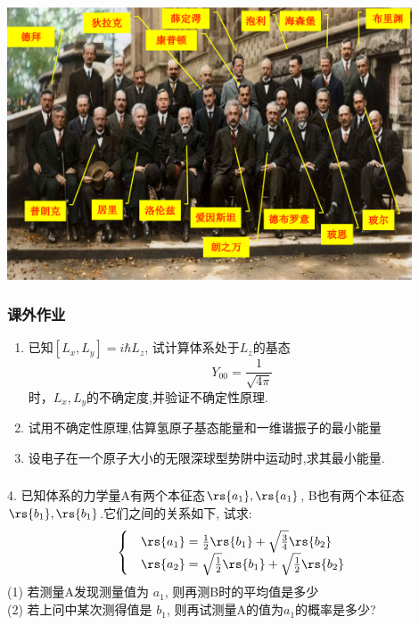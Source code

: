 \begin{frame} 
    \frametitle{}
    \includegraphics[width=0.9\textwidth]{figs/meet.png}
\end{frame} 

\begin{frame}
    \frametitle{课外作业}
    \begin{enumerate}
        \item 已知$[L_x, L_y]=i\hbar L_z$, 试计算体系处于$L_z$的基态 $$Y_{00}=\frac{1}{\sqrt{4\pi}}$$时，$L_x, L_y$的不确定度,并验证不确定性原理.
        \item 试用不确定性原理,估算氢原子基态能量和一维谐振子的最小能量
        \item 设电子在一个原子大小的无限深球型势阱中运动时,求其最小能量.
    \end{enumerate}
\end{frame}

\begin{frame}
    \frametitle{}
       4. 已知体系的力学量A有两个本征态$\rs{a_1}, \rs{a_1}$, B也有两个本征态$\rs{b_1}, \rs{b_1}$.它们之间的关系如下, 试求: \\
        \[ \begin{cases}
            &\rs{a_1} =\frac{1}{2} \rs{b_1} +  \sqrt{\frac{3}{4}} \rs{b_2} \\
            &\rs{a_2} =\sqrt{\frac{1}{2}} \rs{b_1} +  \sqrt{\frac{1}{2}} \rs{b_2} 
        \end{cases} \]
        (1) 若测量A发现测量值为 $a_1$, 则再测B时的平均值是多少\\
        (2) 若上问中某次测得值是 $b_1$, 则再试测量A的值为$a_1$的概率是多少?
\end{frame}

